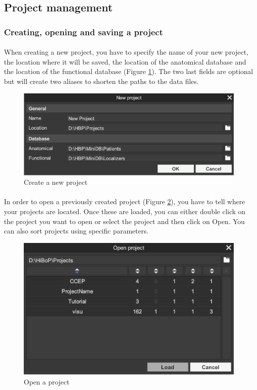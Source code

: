 \documentclass[a4paper]{article}
\begin{document}
\subsection{Project management}
\subsubsection{Creating, opening and saving a project}
\paragraph{} When creating a new project, you have to specify the name of your new project, the location where it will be saved, the location of the anatomical database and the location of the functional database (Figure \ref{newProjectUI}). The two last fields are optional but will create two aliases to shorten the paths to the data files.
\begin{figure}[H]
\begin{center}
\includegraphics[scale=0.5]{NewProject.png}
\end{center}
\caption{\label{newProjectUI}Create a new project}
\end{figure}
\paragraph{} In order to open a previously created project (Figure \ref{openProjectUI}), you have to tell where your projects are located. Once these are loaded, you can either double click on the project you want to open or select the project and then click on Open. You can also sort projects using specific parameters.
\begin{figure}[H]
\begin{center}
\includegraphics[scale=0.5]{OpenProject.png}
\end{center}
\caption{\label{openProjectUI}Open a project}
\end{figure}
\end{document}
